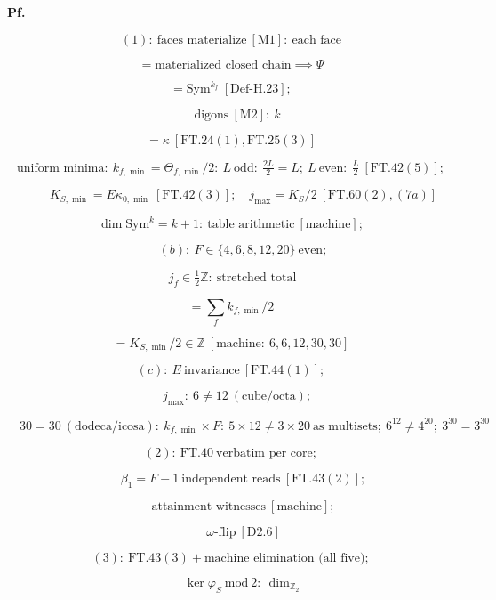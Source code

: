 \begin{theorem}
\textbf{Pf.}

\[
(1):\ \text{faces materialize}\ [\mathrm{M1}]:\ \text{each face}
\]

\[
= \text{materialized closed chain}\implies\Psi
\]

\[
= \mathrm{Sym}^{k_f}\ [\mathrm{Def\text{-}H.23}];
\]

\[
\quad\text{digons}\ [\mathrm{M2}]:\ k
\]

\[
= \kappa\ [\mathrm{FT.24}(1),\mathrm{FT.25}(3)]
\]

\[
\text{uniform minima}:\ k_{f,\min}=\Theta_{f,\min}/2:\ L\ \text{odd}:\ \tfrac{2L}2=L;\ L\ \text{even}:\ \tfrac L2\ [\mathrm{FT.42}(5)];
\]

\[
\qquad K_{S,\min}=E\kappa_{0,\min}\ [\mathrm{FT.42}(3)];\quad j_{\max}=K_S/2\ [\mathrm{FT.60}(2),(7a)]
\]

\[
\dim\mathrm{Sym}^k=k+1:\ \text{table arithmetic}\ [\text{machine}];
\]

\[
\qquad (b):\ F\in\{4,6,8,12,20\}\ \text{even};
\]

\[
\ j_f\in\tfrac12\mathbb Z:\ \text{stretched total}
\]

\[
= \textstyle\sum_fk_{f,\min}/2
\]

\[
= K_{S,\min}/2\in\mathbb Z\ [\text{machine}:\ 6,6,12,30,30]
\]

\[
(c):\ E\ \text{invariance}\ [\mathrm{FT.44}(1)];
\]

\[
\quad j_{\max}:\ 6\ne12\ (\text{cube/octa});
\]

\[
\quad 30=30\ (\text{dodeca/icosa}):\ k_{f,\min}\times F:\ 5\times12\ne3\times20\ \text{as multisets};\ 6^{12}\ne4^{20};\ 3^{30}=3^{30}
\]

\[
(2):\ \mathrm{FT.40}\ \text{verbatim per core};
\]

\[
\qquad \beta_1=F-1\ \text{independent reads}\ [\mathrm{FT.43}(2)];
\]

\[
\qquad \text{attainment witnesses}\ [\text{machine}];
\]

\[
\qquad \omega\text{-flip}\ [\mathrm{D2.6}]
\]

\[
(3):\ \mathrm{FT.43}(3)+\text{machine elimination (all five)};
\]

\[
\qquad \ker\varphi_S\ \text{mod}\ 2:\ \dim_{\mathbb Z_2}
\]


\end{theorem}
